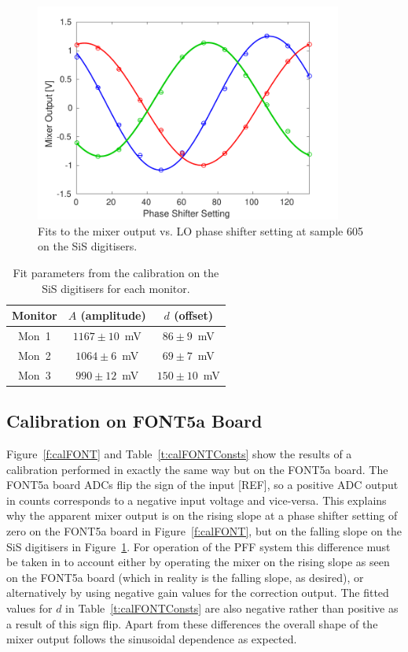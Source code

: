 \begin{figure}
  \centering
  \includegraphics[width=0.9\textwidth]{Figures/phaseMons/calSiS}
  \caption{Fits to the mixer output vs. LO phase shifter setting at sample 605 on the SiS digitisers.}
  \label{f:calSiS}
\end{figure}

\begin{table}
  \begin{center}
    \begin{tabular}{|c c c|}
	   \hline
       Monitor & \(A\) (amplitude) & \(d\) (offset) \\ \hline
       Mon~1 & \(1167\pm10\)~mV & \(86\pm9\)~mV \\ 
       Mon~2 & \(1064\pm6\)~mV & \(69\pm7\)~mV\\
       Mon~3 & \(990\pm12\)~mV & \(150\pm10\)~mV\\ \hline
    \end{tabular}
    \caption{Fit parameters from the calibration on the SiS digitisers for each monitor.}
  	\label{t:calSiSConsts}
  \end{center}
\end{table}

\subsection{Calibration on FONT5a Board}
\label{ss:FONTCal}

Figure~\ref{f:calFONT} and Table~\ref{t:calFONTConsts} show the results of a calibration performed in exactly the same way but on the FONT5a board. The FONT5a board ADCs flip the sign of the input [REF], so a positive ADC output in counts corresponds to a negative input voltage and vice-versa. This explains why the apparent mixer output is on the rising slope at a phase shifter setting of zero on the FONT5a board in Figure~\ref{f:calFONT}, but on the falling slope on the SiS digitisers in Figure~\ref{f:calSiS}. For operation of the PFF system this difference must be taken in to account either by operating the mixer on the rising slope as seen on the FONT5a board (which in reality is the falling slope, as desired), or alternatively by using negative gain values for the correction output. The fitted values for \(d\) in Table~\ref{t:calFONTConsts} are also negative rather than positive as a result of this sign flip. Apart from these differences the overall shape of the mixer output follows the sinusoidal dependence as expected.

